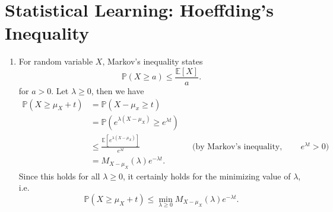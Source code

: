 \documentclass{article}
\begin{document}

\section{Statistical Learning: Hoeffding’s Inequality}

\begin{enumerate}
	\item For random variable $X$, Markov's inequality states
		\[
			\mathbb{P}(X\geq a) \leq \frac{\mathbb{E}[X]}{a} .
		\] 
		for $a > 0$. Let $\lambda \geq 0$, then we have
		\begin{align*}
			\mathbb{P}(X \geq \mu_X + t) &= \mathbb{P}(X-\mu_x \geq t) \\
						     &= \mathbb{P}(e^{\lambda(X-\mu_X)}\geq e^{\lambda t}) \\
						     &\leq \frac{\mathbb{E}[e^{\lambda(X-\mu_X)}]}{e^{\lambda t}} && \text{(by Markov's inequality, since $e^{\lambda t}>0$)} \\
						     &= M_{X-\mu_X}(\lambda) e^{-\lambda t}.
		\end{align*}
		Since this holds for all $\lambda \geq 0$, it certainly holds for the minimizing value of $\lambda$, i.e.
		\[
			\mathbb{P}(X \geq \mu_X + t) \leq \min_{\lambda \geq 0} M_{X-\mu_X}(\lambda) e^{-\lambda t}.
		\] 
	

\end{enumerate}
\end{document}
